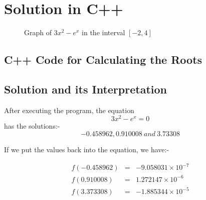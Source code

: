 \documentclass[10pt]{article}
\begin{document}
\section{Solution in C++}
 \begin{figure}[H]
	\centering
	\caption{Graph of $3x^2 - e^x$ in the interval $[-2,4]$}
\end{figure}

\subsection{C++ Code for Calculating the Roots}


\subsection{Solution and its Interpretation}

After executing the program, the equation $$3x^2 - e^x = 0$$ has the solutions:-  $$-0.458962,  0.910008\: and\: 3.73308$$ \medskip

If we put the values back into the equation, we have:- 

\begin{eqnarray}
	f(-0.458962) &=& -9.058031 \times 10^{-7} \\
	f(0.910008) &=& 1.272147 \times 10^{-6} \\
	f(3.373308) &=& -1.885344 \times 10^{-5}
\end{eqnarray}
\end{document}
